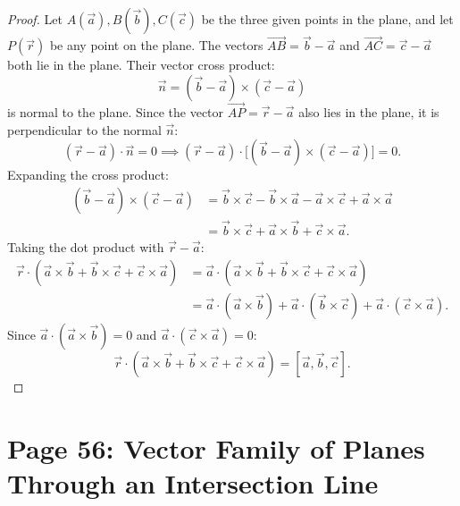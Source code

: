 \begin{proof}
Let $A(\vec{a}), B(\vec{b}), C(\vec{c})$ be the three given points in the plane, and let $P(\vec{r})$ be any point on the plane.
The vectors $\vec{AB} = \vec{b} - \vec{a}$ and $\vec{AC} = \vec{c} - \vec{a}$ both lie in the plane.
Their vector cross product:
\begin{equation}
    \vec{n} = (\vec{b} - \vec{a}) \times (\vec{c} - \vec{a})
\end{equation}
is normal to the plane.
Since the vector $\vec{AP} = \vec{r} - \vec{a}$ also lies in the plane, it is perpendicular to the normal $\vec{n}$:
\begin{equation}
    (\vec{r} - \vec{a}) \cdot \vec{n} = 0 \implies (\vec{r} - \vec{a}) \cdot \bigl[(\vec{b} - \vec{a}) \times (\vec{c} - \vec{a})\bigr] = 0.
\end{equation}
Expanding the cross product:
\begin{align}
    (\vec{b} - \vec{a}) \times (\vec{c} - \vec{a}) &= \vec{b} \times \vec{c} - \vec{b} \times \vec{a} - \vec{a} \times \vec{c} + \vec{a} \times \vec{a} \nonumber\\
    &= \vec{b} \times \vec{c} + \vec{a} \times \vec{b} + \vec{c} \times \vec{a}.
\end{align}
Taking the dot product with $\vec{r} - \vec{a}$:
\begin{align}
    \vec{r} \cdot (\vec{a} \times \vec{b} + \vec{b} \times \vec{c} + \vec{c} \times \vec{a}) &= \vec{a} \cdot (\vec{a} \times \vec{b} + \vec{b} \times \vec{c} + \vec{c} \times \vec{a}) \nonumber\\
    &= \vec{a} \cdot (\vec{a} \times \vec{b}) + \vec{a} \cdot (\vec{b} \times \vec{c}) + \vec{a} \cdot (\vec{c} \times \vec{a}).
\end{align}
Since $\vec{a} \cdot (\vec{a} \times \vec{b}) = 0$ and $\vec{a} \cdot (\vec{c} \times \vec{a}) = 0$:
\begin{equation}
    \vec{r} \cdot (\vec{a} \times \vec{b} + \vec{b} \times \vec{c} + \vec{c} \times \vec{a}) = [\vec{a}, \vec{b}, \vec{c}].
\end{equation}
\end{proof}

\section{Page 56: Vector Family of Planes Through an Intersection Line}
\label{sec:page56}

